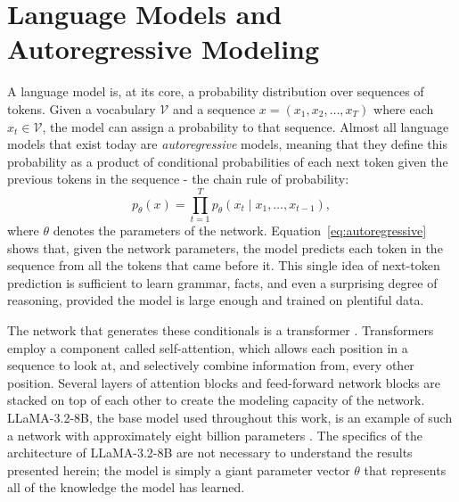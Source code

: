 \documentclass[a4paper,12pt]{report}
\begin{document}
\section{Language Models and Autoregressive Modeling}
A language model is, at its core, a probability distribution over sequences of tokens. Given a vocabulary $\mathcal{V}$ and a sequence $x = (x_1, x_2, \dots, x_T)$ where each $x_t \in \mathcal{V}$, the model can assign a probability to that sequence. Almost all language models that exist today are \emph{autoregressive} models, meaning that they define this probability as a product of conditional probabilities of each next token given the previous tokens in the sequence - the chain rule of probability:
\begin{equation}
	p_\theta(x) = \prod_{t=1}^{T} p_\theta\!\left(x_t \mid x_1, \dots, x_{t-1}\right),
	\label{eq:autoregressive}
\end{equation}
where $\theta$ denotes the parameters of the network. Equation~\eqref{eq:autoregressive} shows that, given the network parameters, the model predicts each token in the sequence from all the tokens that came before it. This single idea of next-token prediction is sufficient to learn grammar, facts, and even a surprising degree of reasoning, provided the model is large enough and trained on plentiful data.

The network that generates these conditionals is a transformer \parencite{vaswani2017attention}. Transformers employ a component called self-attention, which allows each position in a sequence to look at, and selectively combine information from, every other position. Several layers of attention blocks and feed-forward network blocks are stacked on top of each other to create the modeling capacity of the network. LLaMA-3.2-8B, the base model used throughout this work, is an example of such a network with approximately eight billion parameters \parencite{dubey2024llama3}. The specifics of the architecture of LLaMA-3.2-8B are not necessary to understand the results presented herein; the model is simply a giant parameter vector $\theta$ that represents all of the knowledge the model has learned.
\end{document}
